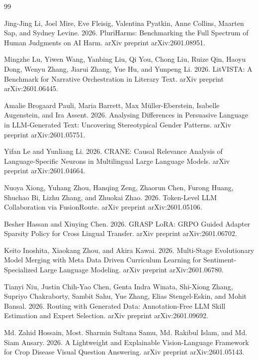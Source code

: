 \documentclass{article}
\begin{document}
\begin{thebibliography}{99}

Jing-Jing Li, Joel Mire, Eve Fleisig, Valentina Pyatkin, Anne Collins, Maarten Sap, and Sydney Levine. 2026. PluriHarms: Benchmarking the Full Spectrum of Human Judgments on AI Harm. arXiv preprint arXiv:2601.08951.

Mingzhe Lu, Yiwen Wang, Yanbing Liu, Qi You, Chong Liu, Ruize Qin, Haoyu Dong, Wenyu Zhang, Jiarui Zhang, Yue Hu, and Yunpeng Li. 2026. LitVISTA: A Benchmark for Narrative Orchestration in Literary Text. arXiv preprint arXiv:2601.06445.

Amalie Brogaard Pauli, Maria Barrett, Max Müller-Eberstein, Isabelle Augenstein, and Ira Assent. 2026. Analysing Differences in Persuasive Language in LLM-Generated Text: Uncovering Stereotypical Gender Patterns. arXiv preprint arXiv:2601.05751.

Yifan Le and Yunliang Li. 2026. CRANE: Causal Relevance Analysis of Language-Specific Neurons in Multilingual Large Language Models. arXiv preprint arXiv:2601.04664.

Nuoya Xiong, Yuhang Zhou, Hanqing Zeng, Zhaorun Chen, Furong Huang, Shuchao Bi, Lizhu Zhang, and Zhuokai Zhao. 2026. Token-Level LLM Collaboration via FusionRoute. arXiv preprint arXiv:2601.05106.

Besher Hassan and Xiuying Chen. 2026. GRASP LoRA: GRPO Guided Adapter Sparsity Policy for Cross Lingual Transfer. arXiv preprint arXiv:2601.06702.

Keito Inoshita, Xiaokang Zhou, and Akira Kawai. 2026. Multi-Stage Evolutionary Model Merging with Meta Data Driven Curriculum Learning for Sentiment-Specialized Large Language Modeling. arXiv preprint arXiv:2601.06780.

Tianyi Niu, Justin Chih-Yao Chen, Genta Indra Winata, Shi-Xiong Zhang, Supriyo Chakraborty, Sambit Sahu, Yue Zhang, Elias Stengel-Eskin, and Mohit Bansal. 2026. Routing with Generated Data: Annotation-Free LLM Skill Estimation and Expert Selection. arXiv preprint arXiv:2601.09692.

Md. Zahid Hossain, Most. Sharmin Sultana Samu, Md. Rakibul Islam, and Md. Siam Ansary. 2026. A Lightweight and Explainable Vision-Language Framework for Crop Disease Visual Question Answering. arXiv preprint arXiv:2601.05143.


\end{thebibliography}
\end{document}
